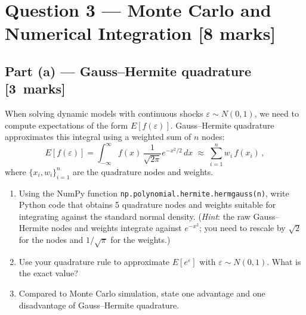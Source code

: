 \documentclass[11pt,a4paper]{article}
\newcommand{\mkpts}[1]{\hfill\textbf{[#1~marks]}}
\begin{document}
\newpage

\section*{Question 3 --- Monte Carlo and Numerical Integration \hfill [8 marks]}

\subsection*{Part (a) --- Gauss--Hermite quadrature \mkpts{3}}

When solving dynamic models with continuous shocks $\varepsilon \sim N(0,1)$, we need to compute expectations of the form $E[f(\varepsilon)]$.  Gauss--Hermite quadrature approximates this integral using a weighted sum of $n$ nodes:
\[
E[f(\varepsilon)] = \int_{-\infty}^{\infty} f(x)\,\frac{1}{\sqrt{2\pi}}e^{-x^2/2}\,dx \;\approx\; \sum_{i=1}^{n} w_i\, f(x_i)\,,
\]
where $\{x_i, w_i\}_{i=1}^n$ are the quadrature nodes and weights.

\begin{enumerate}[label=(\roman*),nosep]
\item Using the NumPy function \texttt{np.polynomial.hermite.hermgauss(n)}, write Python code that obtains 5 quadrature nodes and weights suitable for integrating against the standard normal density.  (\textit{Hint}: the raw Gauss--Hermite nodes and weights integrate against $e^{-x^2}$; you need to rescale by $\sqrt{2}$ for the nodes and $1/\sqrt{\pi}$ for the weights.)
\item Use your quadrature rule to approximate $E[e^{\varepsilon}]$ with $\varepsilon\sim N(0,1)$.  What is the exact value?
\item Compared to Monte Carlo simulation, state one advantage and one disadvantage of Gauss--Hermite quadrature.
\end{enumerate}
\end{document}
